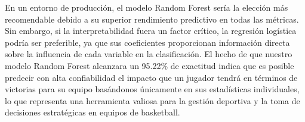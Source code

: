 En un entorno de producción, el modelo Random Forest sería la elección más recomendable debido a su superior rendimiento predictivo en todas las métricas. Sin embargo, si la interpretabilidad fuera un factor crítico, la regresión logística podría ser preferible, ya que sus coeficientes proporcionan información directa sobre la influencia de cada variable en la clasificación. El hecho de que nuestro modelo Random Forest alcanzara un 95.22\% de exactitud indica que es posible predecir con alta confiabilidad el impacto que un jugador tendrá en términos de victorias para su equipo basándonos únicamente en sus estadísticas individuales, lo que representa una herramienta valiosa para la gestión deportiva y la toma de decisiones estratégicas en equipos de basketball.